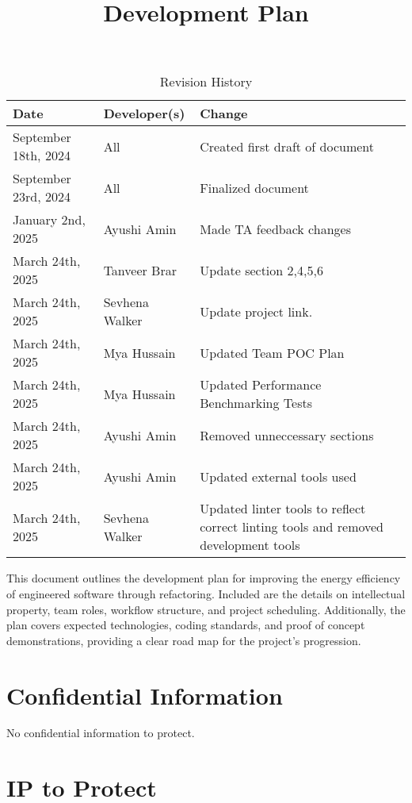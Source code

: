 \documentclass{article}
\title{Development Plan\\ \progname}
\author{\authname}
\date{}
\begin{document}
\maketitle

\begin{table}[hp]
  \caption{Revision History} \label{TblRevisionHistory}
  \begin{tabularx}{\textwidth}{llX}
    \toprule
    \textbf{Date} & \textbf{Developer(s)} & \textbf{Change}\\
    \midrule
    September 18th, 2024 & All & Created first draft of document\\
    September 23rd, 2024 & All & Finalized document\\
    January 2nd, 2025 & Ayushi Amin & Made TA feedback changes\\
    March 24th, 2025 & Tanveer Brar & Update section 2,4,5,6\\ 
    March 24th, 2025 & Sevhena Walker & Update project link.\\
    March 24th, 2025 & Mya Hussain & Updated Team POC Plan\\ 
    March 24th, 2025 & Mya Hussain & Updated Performance Benchmarking Tests\\ 
    March 24th, 2025 & Ayushi Amin & Removed unneccessary sections\\
    March 24th, 2025 & Ayushi Amin & Updated external tools used\\
    March 24th, 2025 & Sevhena Walker & Updated linter tools to reflect correct linting tools and removed development tools\\
    \bottomrule
  \end{tabularx}
\end{table}

\newpage{}

\noindent
This document outlines the development plan for improving the energy
efficiency of
engineered software through refactoring. Included are the details on
intellectual property,
team roles, workflow structure, and project scheduling. Additionally,
the plan covers
expected technologies, coding standards, and proof of concept
demonstrations, providing
a clear road map for the project's progression.

\section{Confidential Information}

No confidential information to protect.
\section{IP to Protect}
\end{document}
